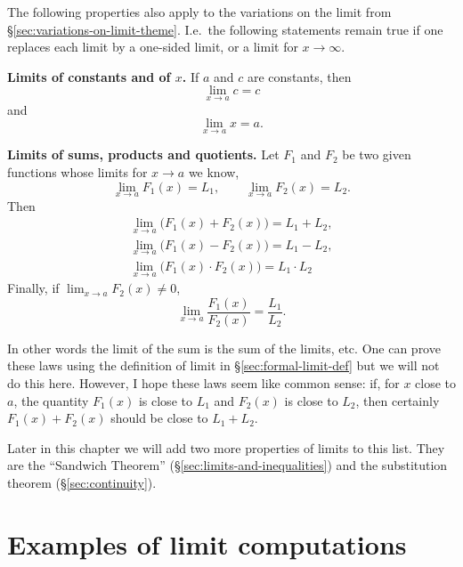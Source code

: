 The following properties also apply to the variations on the limit from
\S\ref{sec:variations-on-limit-theme}.  I.e.\ the following statements remain
true if one replaces each limit by a one-sided limit, or a limit for
$x\to\infty$.  \smallskip

\textbf{Limits of constants and of $x$. } If $a$ and $c$ are constants,
then
\begin{equation}
  \lim_{x\to a}c=c \tag{$P_1$}
\end{equation}
and
\begin{equation}
  \lim_{x\to a} x= a.\tag{$P_2$}
\end{equation}

\textbf{Limits of sums, products and quotients. } Let $F_1$ and $F_2$ be
two given functions whose limits for $x\to a$ we know,
\[
\lim_{x\to a}F_1(x)=L_1, \qquad \lim_{x\to a}F_2(x)=L_2.
\]
Then
\begin{align}
  \lim_{x\to a}\bigl(F_1(x)+F_2(x)\bigr)=L_1+L_2, \tag{$P_3$} \\
  \lim_{x\to a}\bigl(F_1(x)-F_2(x)\bigr)= L_1 - L_2, \tag{$P_4$} \\
  \lim_{x\to a}\bigl(F_1(x)\cdot F_2(x)\bigr)= L_1\cdot L_2 \tag{$P_5$}
\end{align}
Finally, if $ \lim_{x\to a}F_2(x)\ne0$,
\begin{equation}
  \lim_{x\to a}\frac{F_1(x)}{F_2(x)}= \frac{L_1}{L_2}.\tag{$P_6$}
\end{equation}

In other words the limit of the sum is the sum of the limits, etc.  One can
prove these laws using the definition of limit in
\S\ref{sec:formal-limit-def} but we will not do this here.  However, I hope
these laws seem like common sense: if, for $x$ close to $a$, the quantity
$F_1(x)$ is close to $L_1$ and $F_2(x)$ is close to $L_2$, then certainly
$F_1(x)+F_2(x)$ should be close to $L_1+L_2$.



Later in this chapter we will add two more properties of limits to
this list.  They are the ``Sandwich Theorem''
(\S\ref{sec:limits-and-inequalities}) and the substitution theorem
(\S\ref{sec:continuity}).

\section{Examples of limit computations}

